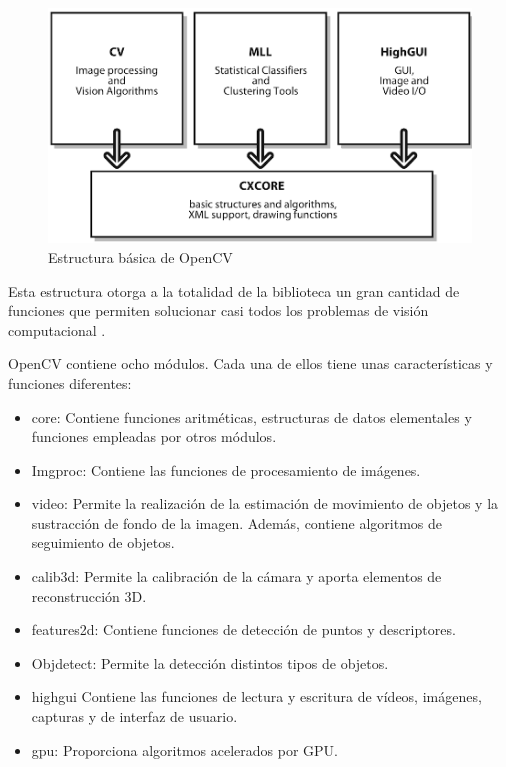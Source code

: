 \begin{figure}
\centering
\includegraphics[scale = 0.7]{capitulo_02/figuras_dir/estructura.jpg}
\caption{Estructura básica de OpenCV}
\label{fig:figura3}
\end{figure}

Esta estructura otorga a la totalidad de la biblioteca un gran cantidad de funciones que permiten solucionar casi todos los problemas de visión computacional \citep{arevalo2004libreria}. 

OpenCV contiene ocho módulos. Cada una de ellos tiene unas características y funciones diferentes:
\begin{itemize}
\item core: Contiene funciones aritméticas, estructuras de datos elementales y funciones empleadas por otros módulos.
\item Imgproc: Contiene las funciones de procesamiento de imágenes.
\item video: Permite la realización de la estimación de movimiento de objetos y la sustracción de fondo de la imagen. Además, contiene algoritmos de seguimiento de objetos.
\item calib3d: Permite la calibración de la cámara y aporta elementos de reconstrucción 3D.
\item features2d: Contiene funciones de detección de puntos y descriptores.
\item Objdetect: Permite la detección distintos tipos de objetos.
\item highgui Contiene las funciones de lectura y escritura de vídeos, imágenes, capturas y de interfaz de usuario.
\item gpu: Proporciona algoritmos acelerados por GPU.
\end{itemize}

